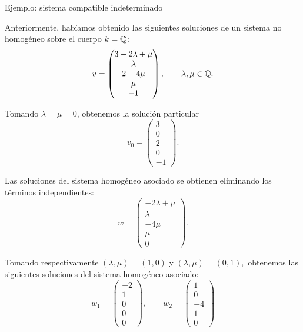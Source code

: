 \begin{frame}[allowframebreaks, t]{Ejemplo: sistema compatible indeterminado}

Anteriormente, habíamos obtenido las siguientes soluciones de un sistema no homogéneo sobre el cuerpo \(k=\mathbb{Q}\):
\[
v=
\begin{pmatrix}
3-2\lambda+\mu\\
\lambda\\
2-4\mu\\
\mu\\
-1
\end{pmatrix}
,
\qquad \lambda,\mu\in \mathbb{Q}.
\]

Tomando \(\lambda=\mu=0\), obtenemos la solución particular
\[
v_0=
\begin{pmatrix}
3\\
0\\
2\\
0\\
-1
\end{pmatrix}.
\]

Las soluciones del sistema homogéneo asociado se obtienen eliminando
los términos independientes:
\[
w=
\begin{pmatrix}
-2\lambda+\mu\\
\lambda\\
-4\mu\\
\mu\\
0
\end{pmatrix}.
\]

Tomando respectivamente
\(
(\lambda,\mu)=(1,0)
\)
y
\(
(\lambda,\mu)=(0,1),
\)
obtenemos las siguientes soluciones del sistema homogéneo asociado:
\[
w_1=
\begin{pmatrix}
-2\\
1\\
0\\
0\\
0
\end{pmatrix},
\qquad
w_2=
\begin{pmatrix}
1\\
0\\
-4\\
1\\
0
\end{pmatrix}
\]


\end{frame}
